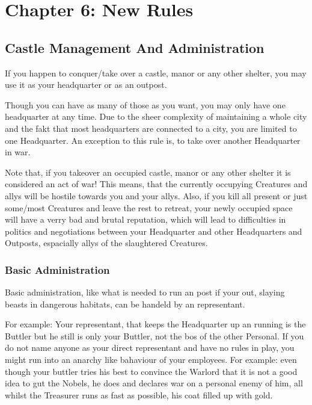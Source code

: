 \documentclass[10pt,twoside,twocolumn,openany]{book}
\begin{document}
\newpage

\chapter{Chapter 6: New Rules}
\section{Castle Management And Administration}

If you happen to conquer/take over a castle, manor or any other shelter, you may use it as your headquarter or as an outpost.

Though you can have as many of those as you want, you may only have one headquarter at any time. Due to the sheer complexity of maintaining a whole city and the fakt that most headquarters are connected to a city, you are limited to one Headquarter. An exception to this rule is, to take over another Headquarter in war.

Note that, if you takeover an occupied castle, manor or any other shelter it is considered an act of war! This means, that the currently occupying Creatures and allys will be hostile towards you and your allys. Also, if you kill all present or just some/most Creatures and leave the rest to retreat, your newly occupied space will have a verry bad and brutal reputation, which will lead to difficulties in politics and negotiations between your Headquarter and other Headquarters and Outposts, espacially allys of the slaughtered Creatures.

\subsection{Basic Administration}

Basic administration, like what is needed to run an post if your out, slaying beasts in dangerous habitats, can be handeld by an representant.

For example: Your representant, that keeps the Headquarter up an running is the Buttler but he still is only your Buttler, not the bos of the other Personal. If you do not name anyone as your direct representant and have no rules in play, you might run into an anarchy like bahaviour of your employees. For example: even though your buttler tries his best to convince the Warlord that it is not a good idea to gut the Nobels, he does and declares war on a personal enemy of him, all whilst the Treasurer runs as fast as possible, his coat filled up with gold.
\end{document}
